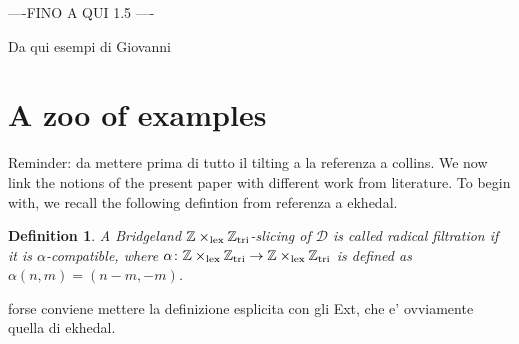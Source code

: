 \documentclass{article}
\newtheorem{defn}[thm]{Definition}
\theoremstyle{definition}
\newtheorem{rem}[thm]{Remark}
\newcommand{\Z}{\mathbb{Z}}
\newcommand{\tee}{\mathfrak{t}}
\newcommand{\lex}{\times_{\textnormal{lex}}}
\newcommand{\triv}{\mathbb{Z}_{\textnormal{tri}}}
\begin{document}
----FINO A QUI 1.5 ----


%
%
%


{\Huge Da qui esempi di Giovanni}
\section{A zoo of examples} 
{\color{red} Reminder: da mettere prima di tutto il tilting a la referenza a collins}. We now link the notions of the present paper with different work from literature. To begin with, we recall the following defintion from {\color{red}referenza a ekhedal}. 

\begin{defn}\label{radical}
A Bridgeland $\Z \lex \triv$-slicing of $\mathscr{D}$ is called \emph{radical filtration} if it is $\alpha$-compatible, where $\alpha \colon \Z \lex \triv \to \Z \lex \triv$ is defined as $\alpha(n,m)=(n-m,-m)$. 
\end{defn}

{\color{red} forse conviene mettere la definizione esplicita con gli Ext, che e' ovviamente quella di ekhedal}.
\end{document}
